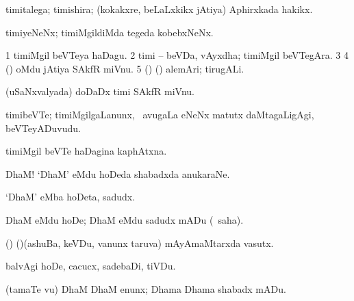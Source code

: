{{{{{{\bentry
{} 
\gl{\nA}
\expl{}
\bmng
{} 
\emng
\eentry

\bentry
{} 
\gl{\nA}
\expl{}
\bmng
timitalega; timishira; (kokakxre, beLaLxkikx jAtiya) Aphirxkada hakikx. 
\emng
\eentry

\bentry
{} 
\gl{\nA}
\expl{}
\bmng
timiyeNeNx; timiMgildiMda tegeda kobebxNeNx. 
\emng
\eentry

\bentry
{} 
\gl{\nA}
\expl{}
\bmng
\bnum
\num{1} timiMgil beVTeya haDagu. 
\num{2} timi -- beVDa, vAyxdha; timiMgil beVTegAra. 
\num{3}  
\num{4} (\AseTxrXV) oMdu jAtiya SAkfR miVnu. 
\num{5} (\AseTxrXV) (\ashi) alemAri; tirugALi. 
\enum
\emng
\eentry

\bentry
{} 
\gl{\nA}
\expl{}
\bmng
(uSaNxvalyada) doDaDx timi SAkfR miVnu. 
\emng
\eentry

\bentry
{} 
\gl{\nA}
\expl{}
\bmng
timibeVTe; timiMgilgaLanunx, \kanmu\ avugaLa eNeNx matutx daMtagaLigAgi, beVTeyADuvudu. 
\emng
\eentry

\bentry
{} 
\gl{\nA}
\expl{}
\bmng
timiMgil beVTe haDagina kaphAtxna. 
\emng
\eentry

\bentry
{} 
\gl{\BAavayx}
\expl{}
\bmng
DhaM! `DhaM' eMdu hoDeda shabadxda anukaraNe. 
\emng
\eentry

\bentry
{}
\gl{\nA}
\expl{}
\bmng
`DhaM' eMba hoDeta, sadudx. 
\emng
\eentry

 \bentry
{}
\gl{\sakirx}
\bmng
DhaM eMdu hoDe; DhaM eMdu sadudx mADu (\akirx\ saha). 
\emng
\eentry

\bentry
{} 
\gl{\nA}
\bmng
(\ame) (\AmA)(ashuBa, keVDu, \mo vanunx taruva) mAyAmaMtarxda vasutx. 
\emng
\eentry

\bentry
{} 
\gl{\sakirx}
\expl{}
\bmng
balvAgi hoDe, cacucx, sadebaDi, tiVDu. 
\emng

\noindent 
\gl{\akirx}
\expl{}
\bmng
(tamaTe \mo vu) DhaM DhaM enunx; Dhama Dhama shabadx mADu. 
\emng
\eentry

}}}}}}
